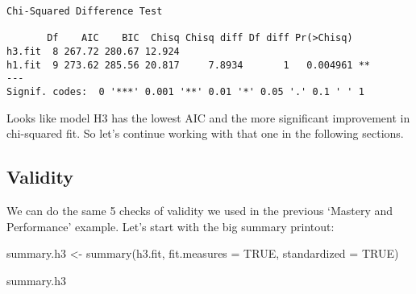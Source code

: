 \documentclass[
  letterpaper,
  DIV=11,
  numbers=noendperiod]{scrreprt}
\newenvironment{Shaded}{\begin{snugshade}}{\end{snugshade}}
\newcommand{\AttributeTok}[1]{\textcolor[rgb]{0.40,0.45,0.13}{#1}}
\newcommand{\ConstantTok}[1]{\textcolor[rgb]{0.56,0.35,0.01}{#1}}
\newcommand{\FunctionTok}[1]{\textcolor[rgb]{0.28,0.35,0.67}{#1}}
\newcommand{\NormalTok}[1]{\textcolor[rgb]{0.00,0.23,0.31}{#1}}
\newcommand{\OtherTok}[1]{\textcolor[rgb]{0.00,0.23,0.31}{#1}}
\begin{document}
\begin{verbatim}
Chi-Squared Difference Test

       Df    AIC    BIC  Chisq Chisq diff Df diff Pr(>Chisq)   
h3.fit  8 267.72 280.67 12.924                                 
h1.fit  9 273.62 285.56 20.817     7.8934       1   0.004961 **
---
Signif. codes:  0 '***' 0.001 '**' 0.01 '*' 0.05 '.' 0.1 ' ' 1
\end{verbatim}

Looks like model H3 has the lowest AIC and the more significant
improvement in chi-squared fit. So let's continue working with that one
in the following sections.

\hypertarget{validity}{%
\subsection*{Validity}\label{validity}}

We can do the same 5 checks of validity we used in the previous `Mastery
and Performance' example. Let's start with the big summary printout:

\begin{Shaded}
\begin{Highlighting}[]
\NormalTok{summary.h3 }\OtherTok{\textless{}{-}} \FunctionTok{summary}\NormalTok{(h3.fit, }\AttributeTok{fit.measures =} \ConstantTok{TRUE}\NormalTok{, }\AttributeTok{standardized =} \ConstantTok{TRUE}\NormalTok{)}

\NormalTok{summary.h3}
\end{Highlighting}
\end{Shaded}
\end{document}
